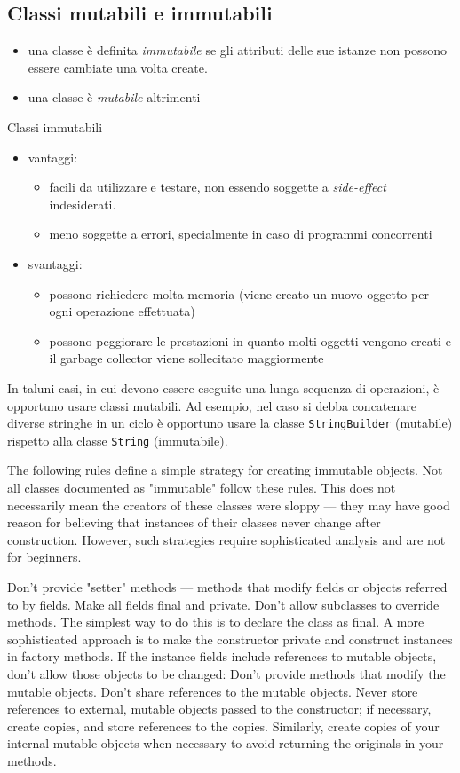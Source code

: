 \documentclass{article}
\begin{document}
\subsection{Classi mutabili e immutabili}
\begin{itemize}
\item una classe è definita \emph{immutabile} se gli attributi delle sue istanze non possono essere cambiate una volta create.
\item una classe è \emph{mutabile} altrimenti
\end{itemize}

Classi immutabili
\begin{itemize}
\item vantaggi:
\begin{itemize}
\item facili da utilizzare e testare, non essendo soggette a \emph{side-effect} indesiderati.
\item meno soggette a errori, specialmente in caso di programmi concorrenti
\end{itemize}
\item svantaggi:
\begin{itemize}
\item possono richiedere molta memoria (viene creato un nuovo oggetto per ogni operazione effettuata)
\item possono peggiorare le prestazioni in quanto molti oggetti vengono creati e il garbage collector viene sollecitato maggiormente
\end{itemize}
\end{itemize}

In taluni casi, in cui devono essere eseguite una lunga sequenza di operazioni, è opportuno usare classi mutabili.
Ad esempio, nel caso si debba concatenare diverse stringhe in un ciclo è opportuno usare la classe
\texttt{StringBuilder} (mutabile) rispetto alla classe \texttt{String} (immutabile).


The following rules define a simple strategy for creating immutable objects. Not all classes documented as "immutable" follow these rules. This does not necessarily mean the creators of these classes were sloppy — they may have good reason for believing that instances of their classes never change after construction. However, such strategies require sophisticated analysis and are not for beginners.

Don't provide "setter" methods — methods that modify fields or objects referred to by fields.
Make all fields final and private.
Don't allow subclasses to override methods. The simplest way to do this is to declare the class as final. A more sophisticated approach is to make the constructor private and construct instances in factory methods.
If the instance fields include references to mutable objects, don't allow those objects to be changed:
Don't provide methods that modify the mutable objects.
Don't share references to the mutable objects. Never store references to external, mutable objects passed to the constructor; if necessary, create copies, and store references to the copies. Similarly, create copies of your internal mutable objects when necessary to avoid returning the originals in your methods.
\end{document}
